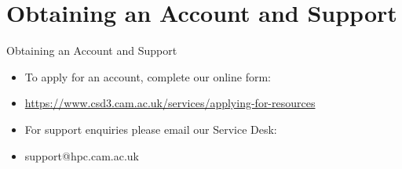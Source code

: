 \section{Obtaining an Account and Support}
\begin{frame}{Obtaining an Account and Support}
\begin{itemize}
\item{To apply for an account, complete our online form:}
\item{\url{https://www.csd3.cam.ac.uk/services/applying-for-resources}}
\pause
\item{For support enquiries please email our Service Desk:}
\item{\alert{support@hpc.cam.ac.uk}}
\end{itemize}
\end{frame}